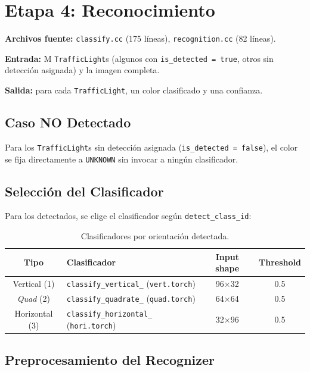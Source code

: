 \section{Etapa 4: Reconocimiento}
\label{sec:funcionamiento_reconocimiento}

\textbf{Archivos fuente:} \texttt{classify.cc} (175 líneas), \texttt{recognition.cc} (82 líneas).

\textbf{Entrada:} M \texttt{TrafficLight}s (algunos con \texttt{is\_detected = true}, otros sin detección asignada) y la imagen completa.

\textbf{Salida:} para cada \texttt{TrafficLight}, un color clasificado y una confianza.

\subsection{Caso NO Detectado}

Para los \texttt{TrafficLight}s sin detección asignada (\texttt{is\_detected = false}), el color se fija directamente a \texttt{UNKNOWN} sin invocar a ningún clasificador.

\subsection{Selección del Clasificador}

Para los detectados, se elige el clasificador según \texttt{detect\_class\_id}:

\begin{table}[H]
\centering
\begin{tabular}{|c|l|c|c|}
\hline
\textbf{Tipo} & \textbf{Clasificador} & \textbf{Input shape} & \textbf{Threshold} \\
\hline
Vertical (1) & \texttt{classify\_vertical\_} (\texttt{vert.torch}) & 96$\times$32 & 0.5 \\
\hline
\textit{Quad} (2) & \texttt{classify\_quadrate\_} (\texttt{quad.torch}) & 64$\times$64 & 0.5 \\
\hline
Horizontal (3) & \texttt{classify\_horizontal\_} (\texttt{hori.torch}) & 32$\times$96 & 0.5 \\
\hline
\end{tabular}
\caption{Clasificadores por orientación detectada.}
\end{table}

\subsection{Preprocesamiento del Recognizer}

